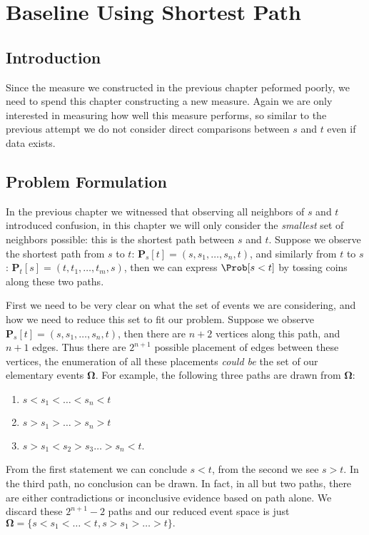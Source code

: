 \section{Baseline Using Shortest Path}

\subsection{Introduction}

Since the measure we constructed in the previous chapter peformed poorly, we need to spend this chapter constructing a new measure. Again we are only interested in measuring how well this measure performs, so similar to the previous attempt we do not consider direct comparisons between $s$ and $t$ even if data exists. 

\subsection{Problem Formulation}

In the previous chapter we witnessed that observing all neighbors of $s$ and $t$ introduced confusion, in this chapter we will only consider the \textit{smallest} set of neighbors possible: this is the shortest path between $s$ and $t$. Suppose we observe the shortest path from $s$ to $t$: $\pmb{P}_s[t] = (s, s_1,\ldots,s_n, t)$, and similarly from $t$ to $s$: $\pmb{P}_t[s] = (t, t_1,\ldots,t_m, s)$, then we can express $\Prob[s < t]$ by tossing coins along these two paths.

First we need to be very clear on what the set of events we are considering, and how we need to reduce this set to fit our problem. Suppose we observe $\pmb{P}_s[t] = (s, s_1, \ldots, s_n, t)$, then there are $n+2$ vertices along this path, and $n+1$ edges. Thus there are $2^{n+1}$ possible placement of edges between these vertices, the enumeration of all these placements \textit{could be} the set of our elementary events $\pmb{\Omega}$. For example, the following three paths are drawn from $\pmb{\Omega}$:
\begin{enumerate}
	\item $s < s_1 < \ldots < s_n < t$
	\item $s > s_1 > \ldots > s_n > t$
	\item $s > s_1 < s_2 > s_3 \ldots > s_n < t$.
\end{enumerate}

From the first statement we can conclude $s < t$, from the second we see $s > t$. In the third path, no conclusion can be drawn. In fact, in all but two paths, there are either contradictions or inconclusive evidence based on path alone. We discard these $2^{n+1}-2$ paths and our reduced event space is just $\pmb{\Omega} = \{s < s_1 < \ldots < t, s > s_1 > \ldots > t\}.$


